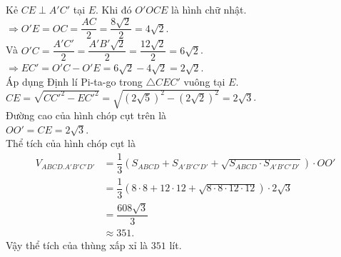 \begin{ex}
{\begin{center}
\begin{tikzpicture}[scale=1, font=\small, line join=round, line cap=round, >=stealth]
            \end{tikzpicture}
        \end{center}
        Kẻ $CE \perp A'C'$ tại $E$. Khi đó $O'OCE$ là hình chữ nhật.\\
        $\Rightarrow O'E = OC = \dfrac{AC}{2} = \dfrac{8\sqrt{2}}{2} = 4\sqrt{2}$.\\
        Và $O'C = \dfrac{A'C'}{2} = \dfrac{A'B'\sqrt{2}}{2} = \dfrac{12\sqrt{2}}{2} = 6\sqrt{2}$.\\
        $\Rightarrow EC'=O'C - O'E = 6\sqrt{2} - 4\sqrt{2} = 2\sqrt{2}$.\\
        Áp dụng Định lí Pi-ta-go trong $\triangle CEC'$ vuông tại $E$.\\
        $CE = \sqrt{CC'^2 - EC'^2} = \sqrt{(2\sqrt{5})^2 - (2\sqrt{2})^2} = 2\sqrt{3}$.\\
        Đường cao của hình chóp cụt trên là \\
        $OO' = CE = 2\sqrt{3}$.\\
        Thể tích của hình chóp cụt là\\
        \begin{align*}
            V_{ABCD.A'B'C'D'} & = \dfrac{1}{3}(S_{ABCD} + S_{A'B'C'D'} + \sqrt{S_{ABCD}\cdot S_{A'B'C'D'}})\cdot OO'     \\
            & = \dfrac{1}{3}(8\cdot 8 + 12\cdot 12 + \sqrt{8\cdot 8 \cdot 12 \cdot 12})\cdot 2\sqrt{3} \\
            & = \dfrac{608\sqrt{3}}{3}                                                                 \\
            & \approx 351.
        \end{align*}
        Vậy thể tích của thùng xấp xỉ là $351$ lít.
    }
\end{ex}























